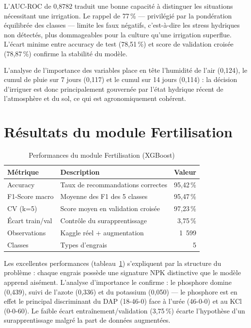 L'AUC-ROC de 0,8782 traduit une bonne capacité à distinguer les
situations nécessitant une irrigation. Le rappel de 77\,\% ---
privilégié par la pondération équilibrée des classes --- limite
les faux négatifs, c'est-à-dire les stress hydriques non
détectés, plus dommageables pour la culture qu'une irrigation
superflue. L'écart minime entre accuracy de test (78,51\,\%) et
score de validation croisée (78,87\,\%) confirme la stabilité du
modèle.

L'analyse de l'importance des variables place en tête l'humidité
de l'air (0,124), le cumul de pluie sur 7 jours (0,117) et le
cumul sur 14 jours (0,114) : la décision d'irriguer est donc
principalement gouvernée par l'état hydrique récent de
l'atmosphère et du sol, ce qui est agronomiquement cohérent.

\section{Résultats du module Fertilisation}
\label{sec:res_fertilisation}

\begin{table}[H]
	\centering
	\caption{Performances du module Fertilisation (XGBoost)}
	\label{tab:res_fert}
	\begin{tabularx}{\textwidth}{lXr}
		\toprule
		\textbf{Métrique} & \textbf{Description} & \textbf{Valeur} \\
		\midrule
		Accuracy        & Taux de recommandations correctes  & 95,42\,\% \\
		F1-Score macro  & Moyenne des F1 des 5 classes       & 95,47\,\% \\
		CV (k=5)        & Score moyen en validation croisée  & 97,23\,\% \\
		Écart train/val & Contrôle du surapprentissage       & 3,75\,\% \\
		\midrule
		Observations    & Kaggle réel + augmentation          & 1~599 \\
		Classes         & Types d'engrais                     & 5 \\
		\bottomrule
	\end{tabularx}
\end{table}

Les excellentes performances (tableau~\ref{tab:res_fert})
s'expliquent par la structure du problème : chaque engrais
possède une signature NPK distinctive que le modèle apprend
aisément. L'analyse d'importance le confirme : le phosphore
domine (0,439), suivi de l'azote (0,336) et du potassium
(0,050) --- le phosphore est en effet le principal discriminant
du DAP (18-46-0) face à l'urée (46-0-0) et au KCl (0-0-60).
Le faible écart entraînement/validation (3,75\,\%) écarte
l'hypothèse d'un surapprentissage malgré la part de données
augmentées.

